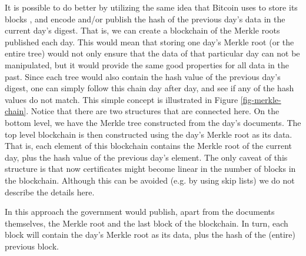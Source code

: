 It is possible to do better by utilizing the same idea that Bitcoin uses to store its blocks \cite{whitepaper}, and encode and/or publish the hash of the previous day's data in the current day's digest. That is, we can create a blockchain of the Merkle roots published each day. This would mean that storing one day's Merkle root (or the entire tree) would not only ensure that the data of that particular day can not be manipulated, but it would provide the same good properties for all data in the past. Since each tree would also contain the hash value of the previous day's digest, one can simply follow this chain day after day, and see if any of the hash values do not match. 
This simple concept is illustrated in Figure \ref{fig-merkle-chain}. Notice that there are two structures that are connected here. On the bottom level, we have the Merkle tree constructed from the day's documents. The top level blockchain is then constructed using the day's Merkle root as its data. That is, each element of this blockchain contains the Merkle root of the current day, plus the hash value of the previous day's element. The only caveat of this structure is that now certificates might become linear in the number of blocks in the blockchain. Although this can be avoided (e.g. by using skip lists) we do not describe the details here.

In this approach the government would publish, apart from the documents themselves, the Merkle root and the last block of the blockchain. In turn, each block will contain the day's Merkle root as its data, plus the hash of the (entire) previous block.

